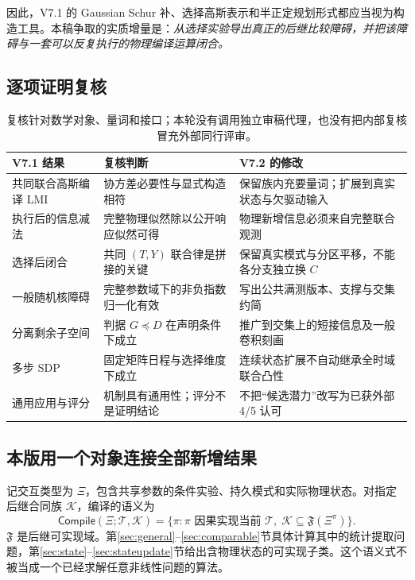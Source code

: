 \documentclass[UTF8,fontset=fandol,11pt,a4paper]{ctexart}
\theoremstyle{definition}\newtheorem{definition}[theorem]{定义}\newtheorem{assumption}[theorem]{条件}
\numberwithin{equation}{section}
\begin{document}
因此，V7.1 的 Gaussian Schur 补、选择高斯表示和半正定规划形式都应当视为构造工具。本稿争取的实质增量是：\emph{从选择实验导出真正的后继比较障碍，并把该障碍与一套可以反复执行的物理编译运算闭合。}

\subsection{逐项证明复核}
\begin{table}[ht]\centering\small
\begin{tabularx}{\linewidth}{p{.25\linewidth}YY}
\toprule
V7.1 结果 & 复核判断 & V7.2 的修改\\\midrule
共同联合高斯编译 LMI & 协方差必要性与显式构造相符 & 保留族内充要量词；扩展到真实状态与欠驱动输入\\
执行后的信息减法 & 完整物理似然除以公开响应似然可得 & 物理新增信息必须来自完整联合观测\\
选择后闭合 & 共同 $(T,Y)$ 联合律是拼接的关键 & 保留真实模式与分区平移，不能各分支独立换 $C$\\
一般随机核障碍 & 完整参数域下的非负指数归一化有效 & 写出公共满测版本、支撑与交集约简\\
分离剩余子空间 & 判据 $G\preceq D$ 在声明条件下成立 & 推广到交集上的短接信息及一般卷积刻画\\
多步 SDP & 固定矩阵日程与选择维度下成立 & 连续状态扩展不自动继承全时域联合凸性\\
通用应用与评分 & 机制具有通用性；评分不是证明结论 & 不把“候选潜力”改写为已获外部 4/5 认可\\
\bottomrule
\end{tabularx}
\caption{复核针对数学对象、量词和接口；本轮没有调用独立审稿代理，也没有把内部复核冒充外部同行评审。}
\end{table}

\subsection{本版用一个对象连接全部新增结果}
记交互类型为 $\Xi$，包含共享参数的条件实验、持久模式和实际物理状态。对指定后继合同族 $\mathcal K$，编译的语义为
\begin{equation}
\mathsf{Compile}(\Xi;\mathcal T,\mathcal K)
=\{\pi:\pi\text{ 因果实现当前 }\mathcal T,
\;\mathcal K\subseteq\mathfrak F(\Xi^\pi)\}.
\end{equation}
$\mathfrak F$ 是后继可实现域。第\ref{sec:general}--\ref{sec:comparable}节具体计算其中的统计提取问题，第\ref{sec:state}--\ref{sec:stateupdate}节给出含物理状态的可实现子类。这个语义式不被当成一个已经求解任意非线性问题的算法。
\end{document}
